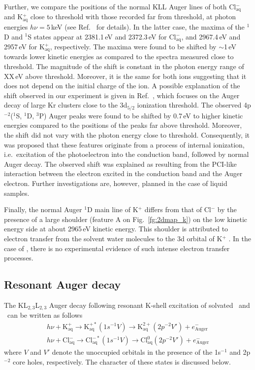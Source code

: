 Further, we compare the positions of the normal KLL Auger lines of both Cl$^{-}_{\text{aq}}$ and K$^{+}_{\text{aq}}$ close to threshold with those recorded far from threshold, at photon energies $h\nu = 5$\,keV (see Ref.\ \citep{ceolin17:263003} for details). In the latter case, the maxima of the $^1$D and $^1$S states appear at 2381.1\,eV and 2372.3\,eV for Cl$^{-}_{\text{aq}}$, and 2967.4\,eV and 2957\,eV for K$^{+}_{\text{aq}}$, respectively. The maxima were found to be shifted by $\sim$1\,eV towards lower kinetic energies as compared to the spectra measured close to threshold. The magnitude of the shift is constant in the photon energy range of {\color{red}XX\,eV above threshold.} Moreover, it is the same for both ions suggesting that it does not depend on the initial charge of the ion. A possible explanation of the shift observed in our experiment is given in Ref.\ \cite{tchaplyguine07:124314}, which focuses on the Auger decay of large Kr clusters close to the 3d$_{5/2}$ ionization threshold. The observed 4p$^{-2}$($^1$S, $^1$D, $^3$P) Auger peaks were found to be shifted by 0.7\,eV to higher kinetic energies compared to the positions of the peaks far above threshold. Moreover, the shift did not vary with the photon energy close to threshold. Consequently, it was proposed that these features originate from a process of internal ionization, i.e.\ excitation of the photoelectron into the conduction band, followed by normal Auger decay. The observed shift was explained as resulting from the PCI-like interaction between the electron excited in the conduction band and the Auger electron. Further investigations are, however, planned in the case of liquid samples.


Finally, the normal Auger $^1$D main line of K$^{+}$ differs from that of Cl$^{-}$ by the presence of a large shoulder (feature A on Fig.\ \ref{fg:2dmap_k}) on the low kinetic energy side at about 2965\,eV kinetic energy. This shoulder is attributed to electron transfer from the solvent water molecules to the 3d orbital of K$^{+}$ \citep{ceolin17:263003}. In the case of \cli, there is no experimental evidence of such intense electron transfer processes.


\subsection{Resonant Auger decay} \label{ssec:ra}


The KL$_{2,3}$L$_{2,3}$ Auger decay following resonant K-shell excitation of solvated \ki~and \cli~can be written as follows
%
\begin{align*}
h\nu + \text{K}^{+}_{\text{aq}} \rightarrow \text{K}^{+*}_{\text{aq}} (1s^{-1}V) \rightarrow \text{K}^{2+}_{\text{aq}} (2p^{-2}V') + e^{-}_{\text{Auger}}\\
%
h\nu + \text{Cl}^{-}_{\text{aq}} \rightarrow \text{Cl}^{-*}_{\text{aq}} (1s^{-1}V) \rightarrow \text{Cl}^{0}_{\text{aq}}(2p^{-2}V') + e^{-}_{\text{Auger}}
\end{align*}
%
where $V$ and $V'$ denote the unoccupied orbitals in the presence of the 1s$^{-1}$ and 2p$^{-2}$ core holes, respectively. The character of these states is discussed below.

